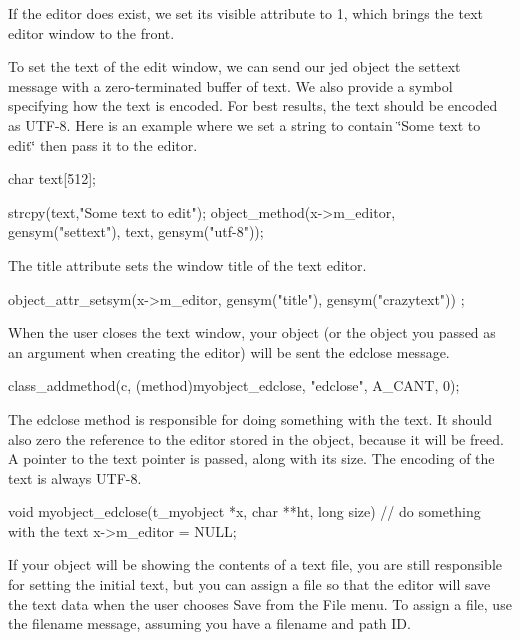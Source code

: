 If the editor does exist, we set its visible attribute to 1, which brings the text editor window to the front.

To set the text of the edit window, we can send our jed object the settext message with a zero-\/terminated buffer of text. We also provide a symbol specifying how the text is encoded. For best results, the text should be encoded as UTF-\/8. Here is an example where we set a string to contain \char`\"{}Some text to edit\char`\"{} then pass it to the editor.


\begin{DoxyCode}
            char text[512];

            strcpy(text,"Some text to edit");
            object_method(x->m_editor, gensym("settext"), text, gensym("utf-8"));
       
\end{DoxyCode}


The title attribute sets the window title of the text editor. 
\begin{DoxyCode}
            object_attr_setsym(x->m_editor, gensym("title"), gensym("crazytext"))
      ;
\end{DoxyCode}


When the user closes the text window, your object (or the object you passed as an argument when creating the editor) will be sent the edclose message. 
\begin{DoxyCode}
            class_addmethod(c, (method)myobject_edclose, "edclose", A_CANT, 0);
\end{DoxyCode}


The edclose method is responsible for doing something with the text. It should also zero the reference to the editor stored in the object, because it will be freed. A pointer to the text pointer is passed, along with its size. The encoding of the text is always UTF-\/8.


\begin{DoxyCode}
    void myobject_edclose(t_myobject *x, char **ht, long size)
    {
        // do something with the text
        x->m_editor = NULL;
    }
\end{DoxyCode}


If your object will be showing the contents of a text file, you are still responsible for setting the initial text, but you can assign a file so that the editor will save the text data when the user chooses Save from the File menu. To assign a file, use the filename message, assuming you have a filename and path ID.


